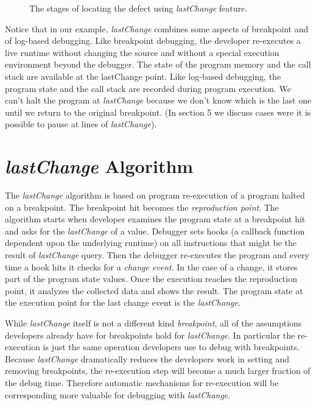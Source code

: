 \documentclass[preprint]{sigplanconf}
\begin{document}
\begin{figure}[htp]
\caption{The stages of locating the defect using \textit{lastChange} feature.}
\label{fig:lastChange}
\end{figure}


Notice that in our example, \textit{lastChange} combines some aspects
of breakpoint and of log-based debugging. Like breakpoint debugging,
the developer re-executes a live runtime without changing the source
and without a special execution environment beyond the debugger. The
state of the program memory and the call stack are available at the
lastChange point. Like log-based debugging, the program state and the
call stack are recorded during program execution. We can't halt the
program at \textit{lastChange} because we don't know which is the last
one until we return to the original breakpoint. (In section 5 we
discuss cases were it is possible to pause at lines of \textit{lastChange}).

\section{\textit{lastChange} Algorithm}

The \textit{lastChange} algorithm is based on program re-execution of
a program halted on a breakpoint. The breakpoint hit becomes the
\textit{reproduction point}. The algorithm starts when developer
examines the program state at a breakpoint hit and asks for the
\textit{lastChange} of a value.  Debugger sets hooks (a callback
function dependent upon the underlying runtime) on all instructions
that might be the result of \textit{lastChange} query. Then the
debugger re-executes the program and every time a hook hits it
checks for a \textit{change event}. In the case of a change, it stores
part of the program state values.  Once the execution reaches the
reproduction point, it analyzes the collected data and shows the
result.  The program state at the execution point for the last change
event is the \textit{lastChange}.

While \textit{lastChange} itself is not a different kind \textit{breakpoint},
all of the assumptions developers already have for breakpoints hold
for \textit{lastChange}. In particular the re-execution is just the
same operation developers use to debug with breakpoints. Because
\textit{lastChange} dramatically reduces the developers work in
setting and removing breakpoints, the re-execution step will become a
much larger fraction of the debug time. Therefore automatic mechanisms
for re-execution will be corresponding more valuable for debugging
with \textit{lastChange}.
\end{document}
